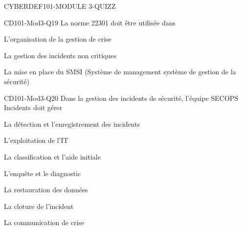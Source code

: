 \documentclass[12pt]{article}
\begin{document}
\begin{quiz}{CYBERDEF101-MODULE 3-QUIZZ}
\begin{multi}[multiple=true]{CD101-Mod3-Q19}
La norme 22301 doit \^etre utilis\'ee dans
\item* L'organisation de la gestion de crise
\item La gestion des incidents non critiques
\item La mise en place du SMSI (Syst\`eme de management syst\`eme de gestion de la s\'ecurit\'e)
\end{multi}

\begin{multi}[multiple=true]{CD101-Mod3-Q20}
 Dans la gestion des incidents de s\'ecurit\'e, l'\'equipe SECOPS Incidents doit g\'erer
\item* La d\'etection et l'enregistrement des incidents
\item L'exploitation de l'IT
\item* La classification et l'aide initiale
\item* L'enqu\^ete et le diagnostic
\item La restauration des donn\'ees
\item* La cloture de l'incident
\item La communication de crise
\end{multi}

 \end{quiz}
 
 
\end{document}

